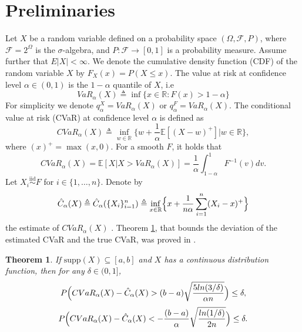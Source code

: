 \documentclass[letterpaper]{article} %
\newtheorem{theorem}{Theorem}[section]
\begin{document}
\section{Preliminaries}
\addtocounter{section}{1}
Let $X$ be a random variable defined on a probability space $(\Omega, \mathcal{F}, P)$, where $\mathcal{F} = 2^\Omega$ is the $\sigma$-algebra, and $P : \mathcal{F} \to [0,1]$ is a probability measure. Assume further that $E|X| < \infty$. We denote the cumulative density function (CDF) of the random variable $X$ by $F_X(x)=P(X\leq x)$. The value at risk at confidence level $\alpha \in (0,1)$ is the $1-\alpha$ quantile of $X$, i.e \begin{equation}
	VaR_\alpha (X) \triangleq \inf\{x\in \mathbb{R}:F(x) > 1-\alpha\}
\end{equation}
For simplicity we denote $q_\alpha^X=VaR_\alpha(X)$ or $q_\alpha^F=VaR_\alpha(X)$. The conditional value at risk (CVaR) at confidence level $\alpha$ is defined as \cite{rockafellar2000optimization}
\begin{equation}
	CVaR_\alpha(X) \triangleq \inf_{w\in \mathbb{R}}\{w+\frac{1}{\alpha}\mathbb{E}[(X-w)^+]|w\in \mathbb{R}\},
\end{equation}
where $(x)^+=\max{(x,0)}$. For a smooth $F$, it holds that \cite{pflug2000some}
\begin{equation}\label{def:cvar_as_conditional_expectation}
	CVaR_\alpha(X)=\mathbb{E}[X|X>VaR_\alpha(X)]=\frac{1}{\alpha}\int_{1-\alpha}^1 F^{-1}(v)dv.
\end{equation}
Let $X_i \overset{\text{iid}}{\sim} F$ for $i\in\{1,\dots,n\}$. Denote by
\begin{equation}\label{eq:brown_cvar_estimator}
	\hat{C}_\alpha(X) \triangleq \hat{C}_\alpha(\{X_i\}^{n}_{i=1}) \triangleq \inf_{x\in \mathbb{R}} \Bigl{\{}x+\frac{1}{n\alpha} \sum_{i=1}^n(X_i-x)^+\Bigr{\}}
\end{equation}
the estimate of $CVaR_\alpha(X)$ \cite{brown2007large}. Theorem \ref{thm:brown_bounds}, 
that bounds the deviation of the estimated CVaR and the true CVaR, was proved in \cite{brown2007large}.
\begin{theorem}\label{thm:brown_bounds}
	If $\text{supp}(X) \subseteq [a, b]$ and $X$ has a continuous distribution function, then for any $\delta \in (0, 1]$, 
	\begin{equation}
		P\Bigl{(}CVaR_\alpha(X)-\hat{C}_\alpha(X)>(b-a)\sqrt{\frac{5ln(3/\delta)}{\alpha n}}\Bigr{)}\leq \delta,
	\end{equation}
	\begin{equation}
		P\Bigl{(}CVaR_\alpha(X)-\hat{C}_\alpha(X)<-\frac{(b-a)}{\alpha}\sqrt{\frac{ln(1/\delta)}{2n}}\Bigr{)}\leq \delta.
	\end{equation}
\end{theorem}
\end{document}

